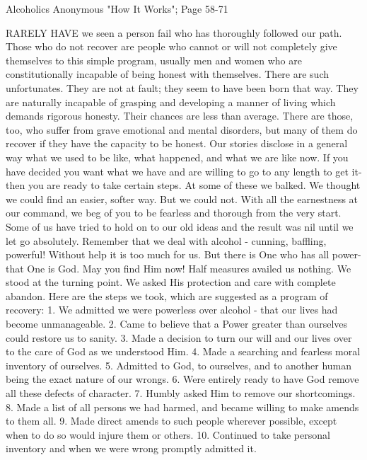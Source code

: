 
Alcoholics Anonymous "How It Works"; Page 58-71

\begin{biblechapter}
RARELY HAVE we seen a person fail who has thoroughly followed our path.  Those who do not recover are people who cannot or will not completely give themselves to this simple program, usually men and women who are constitutionally incapable of being honest with themselves.  There are such unfortunates.  They are not at fault; they seem to have been born that way.  They are naturally incapable of grasping and developing a manner of living which demands rigorous honesty.  Their chances are less than average.  There are those, too, who suffer from grave emotional and mental disorders, but many of them do recover if they have the capacity to be honest.
Our stories disclose in a general way what we used to be like, what happened, and what we are like now. If you have decided you want what we have and are willing to go to any length to get it-then you are ready to take certain steps.
At some of these we balked.  We thought we could find an easier, softer way.  But we could not.  With all the earnestness at our command, we beg of you to be fearless and thorough from the very start.  Some of us have tried to hold on to our old ideas and the result was nil until we let go absolutely.
Remember that we deal with alcohol - cunning, baffling, powerful!  Without help it is too much for us.  But there is One who has all power-that One is God.  May you find Him now!
Half measures availed us nothing.  We stood at the turning point.  We asked His protection and care with complete abandon.
Here are the steps we took, which are suggested as a program of recovery:
1. We admitted we were powerless over alcohol - that our lives had become unmanageable.
2. Came to believe that a Power greater than ourselves could restore us to sanity.
3. Made a decision to turn our will and our lives over to the care of God as we understood Him.
4. Made a searching and fearless moral inventory of ourselves.
5. Admitted to God, to ourselves, and to another human being the exact nature of our wrongs.
6. Were entirely ready to have God remove all these defects of character.
7. Humbly asked Him to remove our shortcomings.
8. Made a list of all persons we had harmed, and became willing to make amends to them all.
9. Made direct amends to such people wherever possible, except when to do so would injure them or others.
10. Continued to take personal inventory and when we were wrong promptly admitted it.

\end{biblechapter}
